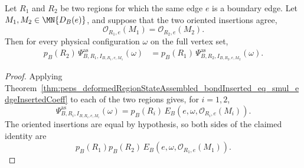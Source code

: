 \begin{theorem}
    \label{thm:peps_bondInserted_windowIndependent}
    \leanok
    Let $R_1$ and $R_2$ be two regions for which the same edge $e$ is a
    boundary edge.  Let $M_1,M_2\in\MN{D_B(e)}$, and suppose that the two
    oriented insertions agree,
    \[
        \mathcal O_{R_1,e}(M_1)=\mathcal O_{R_2,e}(M_2).
    \]
    Then for every physical configuration $\omega$ on the full vertex set,
    \[
    \begin{aligned}
        p_B(R_2)\,
        \Psi^{\mathrm{as}}_{B,R_1,I_{B,R_1,e,M_1}}(\omega)
        &=
        p_B(R_1)\,
        \Psi^{\mathrm{as}}_{B,R_2,I_{B,R_2,e,M_2}}(\omega).
    \end{aligned}
    \]
\end{theorem}
\begin{proof}
    \leanok
    Applying
    Theorem~\ref{thm:peps_deformedRegionStateAssembled_bondInserted_eq_smul_edgeInsertedCoeff}
    to each of the two regions gives, for $i=1,2$,
    \[
        \Psi^{\mathrm{as}}_{B,R_i,I_{B,R_i,e,M_i}}(\omega)
        =
        p_B(R_i)\,E_B(e,\omega,\mathcal O_{R_i,e}(M_i)).
    \]
    The oriented insertions are equal by hypothesis, so both sides of the
    claimed identity are
    \[
        p_B(R_1)p_B(R_2)\,E_B(e,\omega,\mathcal O_{R_1,e}(M_1)).
    \]
\end{proof}
